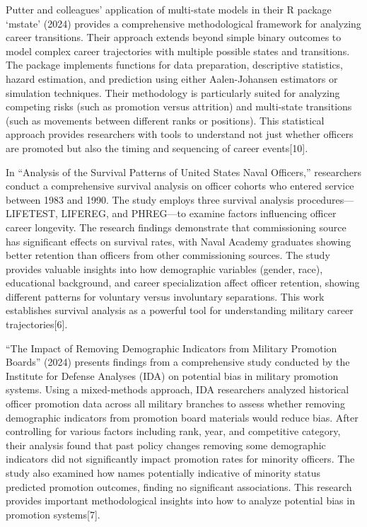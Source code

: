 \documentclass[
  letterpaper,
  DIV=11,
  numbers=noendperiod]{scrartcl}
\begin{document}
Putter and colleagues' application of multi-state models in their R
package `mstate' (2024) provides a comprehensive methodological
framework for analyzing career transitions. Their approach extends
beyond simple binary outcomes to model complex career trajectories with
multiple possible states and transitions. The package implements
functions for data preparation, descriptive statistics, hazard
estimation, and prediction using either Aalen-Johansen estimators or
simulation techniques. Their methodology is particularly suited for
analyzing competing risks (such as promotion versus attrition) and
multi-state transitions (such as movements between different ranks or
positions). This statistical approach provides researchers with tools to
understand not just whether officers are promoted but also the timing
and sequencing of career events{[}10{]}.

In ``Analysis of the Survival Patterns of United States Naval
Officers,'' researchers conduct a comprehensive survival analysis on
officer cohorts who entered service between 1983 and 1990. The study
employs three survival analysis procedures---LIFETEST, LIFEREG, and
PHREG---to examine factors influencing officer career longevity. The
research findings demonstrate that commissioning source has significant
effects on survival rates, with Naval Academy graduates showing better
retention than officers from other commissioning sources. The study
provides valuable insights into how demographic variables (gender,
race), educational background, and career specialization affect officer
retention, showing different patterns for voluntary versus involuntary
separations. This work establishes survival analysis as a powerful tool
for understanding military career trajectories{[}6{]}.

``The Impact of Removing Demographic Indicators from Military Promotion
Boards'' (2024) presents findings from a comprehensive study conducted
by the Institute for Defense Analyses (IDA) on potential bias in
military promotion systems. Using a mixed-methods approach, IDA
researchers analyzed historical officer promotion data across all
military branches to assess whether removing demographic indicators from
promotion board materials would reduce bias. After controlling for
various factors including rank, year, and competitive category, their
analysis found that past policy changes removing some demographic
indicators did not significantly impact promotion rates for minority
officers. The study also examined how names potentially indicative of
minority status predicted promotion outcomes, finding no significant
associations. This research provides important methodological insights
into how to analyze potential bias in promotion systems{[}7{]}.
\end{document}
